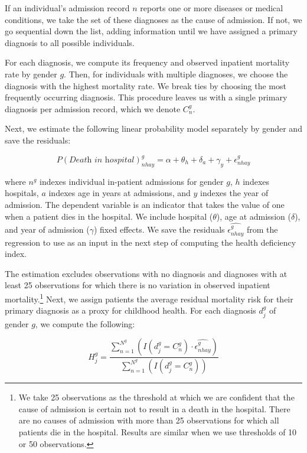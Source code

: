 \documentclass[12pt,english]{article}
\begin{document}
\noindent If an individual's admission record $n$ reports one or more diseases or medical conditions, we take the set of these diagnoses as the cause of admission. If not, we go sequential down the list, adding information until we have assigned a primary diagnosis to all possible individuals. 

For each diagnosis, we compute its frequency and observed inpatient mortality rate by gender $g$. Then, for individuals with multiple diagnoses, we choose the diagnosis with the highest mortality rate. We break ties by choosing the most frequently occurring diagnosis. This procedure leaves us with a single primary diagnosis per admission record, which we denote $C_{n}^g$.

Next, we estimate the following linear probability model separately by gender and save the residuals:

\begin{equation}
    P(\textit{Death in hospital})_{nhay}^g = \alpha + \theta_{h} + \delta_{a} + \gamma_{y} + \epsilon_{nhay}^g\label{eq:hospdeath}
\end{equation}

\noindent where $n^g$ indexes individual in-patient admissions for gender $g$, $h$ indexes hospitals, $a$ indexes age in years at admissions, and $y$ indexes the year of admission. The dependent variable is an indicator that takes the value of one when a patient dies in the hospital. We include hospital ($\theta$), age at admission ($\delta$), and year of admission ($\gamma$) fixed effects. We save the residuals $\widehat{\epsilon_{nhay}^g}$ from the regression to use as an input in the next step of computing the health deficiency index. 

The estimation excludes observations with no diagnosis and diagnoses with at least 25 observations for which there is no variation in observed inpatient mortality.\footnote{We take 25 observations as the threshold at which we are confident that the cause of admission is certain not to result in a death in the hospital. There are no causes of admission with more than 25 observations for which all patients die in the hospital. Results are similar when we use thresholds of 10 or 50 observations.} Next, we assign patients the average residual mortality risk for their primary diagnosis as a proxy for childhood health. For each diagnosis $d_{j}^g$ of gender $g$, we compute the following:

\[
    H_{j}^g=\frac{\sum_{n=1}^{N^g}\left(I(d_{j}^g = C_{n}^g)\cdot\widehat{\epsilon_{nhay}^g}\right)}{\sum_{n=1}^{N^g}\left(I(d_{j}^g = C_{n}^g)\right)}
\]
\end{document}
